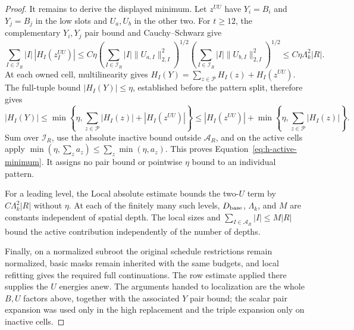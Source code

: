 \begin{proof}
It remains to derive the displayed minimum.  Let \(z^{UU}\) have
\(Y_i=B_i\) and \(Y_j=B_j\) in the low slots and \(U_a,U_b\) in
the other two.  For \(t\ge12\), the complementary \(Y_i,Y_j\)
pair bound and Cauchy--Schwarz give
\[
 \sum_{I\in\mathcal I_R}|I|\,|H_I(z_I^{UU})|
 \le C\eta
   \left(\sum_{I\in\mathcal I_R}|I|\|U_{a,I}\|_{2,I}^2\right)^{1/2}
   \left(\sum_{I\in\mathcal I_R}|I|\|U_{b,I}\|_{2,I}^2\right)^{1/2}
 \le C\eta\Lambda_k^2|R|.
\]
At each owned cell, multilinearity gives
\(H_I(Y)=\sum_{z\in\mathcal P}H_I(z)+H_I(z^{UU})\).
The full-tuple bound \(|H_I(Y)|\le\eta\), established before the
pattern split, therefore gives
\[
 |H_I(Y)|
 \le\min\left\{\eta,\sum_{z\in\mathcal P}|H_I(z)|
                         +|H_I(z^{UU})|\right\}
 \le |H_I(z^{UU})|
      +\min\left\{\eta,\sum_{z\in\mathcal P}|H_I(z)|\right\}.
\]
Sum over \(\mathcal I_R\), use the absolute inactive bound outside
\(\mathcal A_R\), and on the active cells apply
\(\min(\eta,\sum_z a_z)\le\sum_z\min(\eta,a_z)\).
This proves Equation~\eqref{eq:h-active-minimum}.  It assigns no
pair bound or pointwise \(\eta\) bound to an individual pattern.

For a leading level, the Local absolute estimate bounds the
two-\(U\) term by \(C\Lambda_k^2|R|\) without \(\eta\).
At each of the finitely many such levels, \(D_{\rm base}\),
\(\Lambda_k\), and \(M\) are constants independent of spatial
depth.  The local sizes and
\(\sum_{I\in\mathcal A_R}|I|\le M|R|\) bound the active contribution
independently of the number of depths.

Finally, on a normalized subroot the original schedule restrictions
remain normalized, basic masks remain inherited with the same
budgets, and local refitting gives the required full continuations.
The row estimate applied there supplies the \(U\) energies anew.
The arguments handed to localization are the whole \(B,U\) factors
above, together with the associated \(Y\) pair bound; the scalar
pair expansion was used only in the high replacement and the triple
expansion only on inactive cells.
\end{proof}
